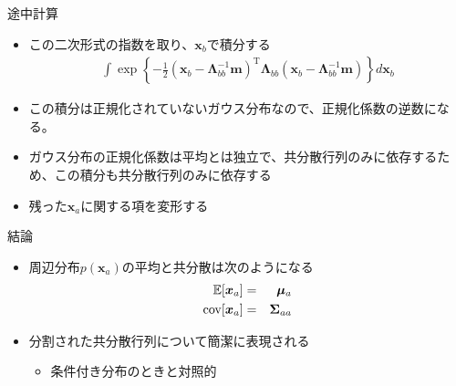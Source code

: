 \begin{frame}{途中計算}
 \begin{itemize}
  \item この二次形式の指数を取り、$\bm{x}_b$で積分する
        \begin{eqnarray}
         \int \exp\left\{-\frac{1}{2}(\bm{x}_b-\bm{\Lambda}_{bb}^{-1}\bm{m})^{\mathrm{T}}\bm{\Lambda}_{bb}(\bm{x}_b-\bm{\Lambda}_{bb}^{-1}\bm{m})\right\}d\bm{x}_b
        \end{eqnarray}
  \item この積分は正規化されていないガウス分布なので、正規化係数の逆数になる。
  \item ガウス分布の正規化係数は平均とは独立で、共分散行列のみに依存するため、この積分も共分散行列のみに依存する
  \item 残った$\bm{x}_a$に関する項を変形する
 \end{itemize}
\end{frame}

\begin{frame}{結論}
 \begin{itemize}
  \item 周辺分布$p(\bm{x}_a)$の平均と共分散は次のようになる
        \begin{eqnarray}
         \mathbb{E}[\bm{x}_a] &=&  \bm{\mu}_a\\
         {\rm cov}[\bm{x}_a]&=&\bm{\Sigma}_{aa}
        \end{eqnarray}
  \item 分割された共分散行列について簡潔に表現される
        \begin{itemize}
         \item 条件付き分布のときと対照的
        \end{itemize}
 \end{itemize}
\end{frame}
